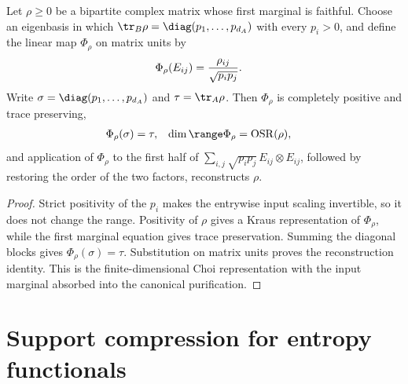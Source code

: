 \begin{theorem}
    \label{thm:supported_marginal_channel}
    \leanok
    Let $\rho\geq0$ be a bipartite complex matrix whose first marginal is
    faithful. Choose an eigenbasis in which
    $\tr_B\rho=\diag(p_1,\ldots,p_{d_A})$ with
    every $p_i>0$, and define the linear map $\Phi_\rho$ on matrix units by
    \begin{align}
        \Phi_\rho(E_{ij})
         & =\frac{\rho_{ij}}{\sqrt{p_ip_j}}.
        \notag
    \end{align}
    Write $\sigma=\diag(p_1,\ldots,p_{d_A})$ and
    $\tau=\tr_A\rho$. Then $\Phi_\rho$ is completely positive and trace
    preserving,
    \begin{align}
        \Phi_\rho(\sigma) & =\tau,
                          & \dim\range\Phi_\rho & =\operatorname{OSR}(\rho),
        \notag
    \end{align}
    and application of
    $\Phi_\rho$ to the first half of
    $\sum_{i,j}\sqrt{p_ip_j}\,E_{ij}\otimes E_{ij}$, followed by restoring the
    order of the two factors, reconstructs $\rho$.
\end{theorem}
\begin{proof}\leanok
    Strict positivity of the $p_i$ makes the entrywise input scaling
    invertible, so it does not change the range. Positivity of $\rho$ gives a
    Kraus representation of $\Phi_\rho$, while the first marginal equation
    gives trace preservation. Summing the diagonal blocks gives
    $\Phi_\rho(\sigma)=\tau$. Substitution on matrix units proves the
    reconstruction identity. This is the finite-dimensional Choi
    representation \cite{Choi1975CompletelyPositive} with the input marginal
    absorbed into the canonical purification.
\end{proof}

\section{Support compression for entropy functionals}


